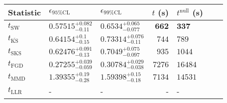 \begin{tabular}{l|llr|llr}
	Statistic & $\epsilon_{95\%\mathrm{CL}}$ & $\epsilon_{99\%\mathrm{CL}}$ & $t$ (s) & $t^{\mathrm{null}}$ (s) \\
	\midrule
	$t_{\mathrm{SW}}$ & $0.57515_{-0.11}^{+0.082}$ & $0.6534_{-0.077}^{+0.065}$ & ${\mathbf{662}}$ & ${\mathbf{337}}$ \\
	$t_{\overline{\mathrm{KS}}}$ & $0.64154_{-0.15}^{+0.1}$ & $0.73314_{-0.11}^{+0.076}$ & $744$ & $789$ \\
	$t_{\mathrm{SKS}}$ & $0.62476_{-0.13}^{+0.091}$ & $0.7049_{-0.097}^{+0.075}$ & $935$ & $1044$ \\
	$t_{\mathrm{FGD}}$ & ${\mathbf{0.27255_{-0.059}^{+0.039}}}$ & ${\mathbf{0.30784_{-0.038}^{+0.029}}}$ & $7276$ & $16484$ \\
	$t_{\mathrm{MMD}}$ & $1.39355_{-0.28}^{+0.19}$ & $1.59398_{-0.18}^{+0.15}$ & $7134$ & $14531$ \\
	$t_{\mathrm{LLR}}$ & - & - & - & - \\
	\bottomrule
\end{tabular}